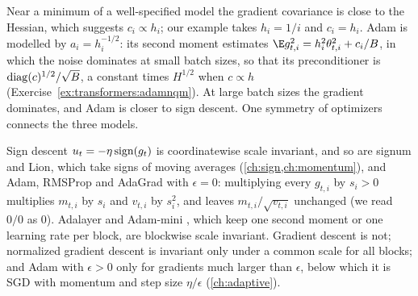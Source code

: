 \begin{refsection}
Near a minimum of a well-specified model the gradient covariance is close to the Hessian, which suggests $c_i\propto h_i$; our example takes $h_i=1/i$ and $c_i=h_i$. Adam is modelled by $a_i=h_i^{-1/2}$: its second moment estimates $\E g_{t,i}^2=h_i^2\theta_{t,i}^2+c_i/B$, in which the noise dominates at small batch sizes, so that its preconditioner is $\operatorname{diag}(c)^{1/2}/\sqrt B$, a constant times $H^{1/2}$ when $c\propto h$ (Exercise~\ref{ex:transformers:adamnqm}). At large batch sizes the gradient dominates, and Adam is closer to sign descent. One symmetry of optimizers connects the three models.


Sign descent $u_t=-\eta\operatorname{sign}(g_t)$ is coordinatewise scale invariant, and so are signum and Lion, which take signs of moving averages (\cref{ch:sign,ch:momentum}), and Adam, RMSProp and AdaGrad with $\epsilon=0$: multiplying every $g_{t,i}$ by $s_i>0$ multiplies $m_{t,i}$ by $s_i$ and $v_{t,i}$ by $s_i^2$, and leaves $m_{t,i}/\sqrt{v_{t,i}}$ unchanged (we read $0/0$ as $0$). Adalayer \parencite{ZhaoEtAl2025} and Adam-mini \parencite{ZhangEtAl2025}, which keep one second moment or one learning rate per block, are blockwise scale invariant. Gradient descent is not; normalized gradient descent is invariant only under a common scale for all blocks; and Adam with $\epsilon>0$ only for gradients much larger than $\epsilon$, below which it is SGD with momentum and step size $\eta/\epsilon$ (\cref{ch:adaptive}).


\end{refsection}
